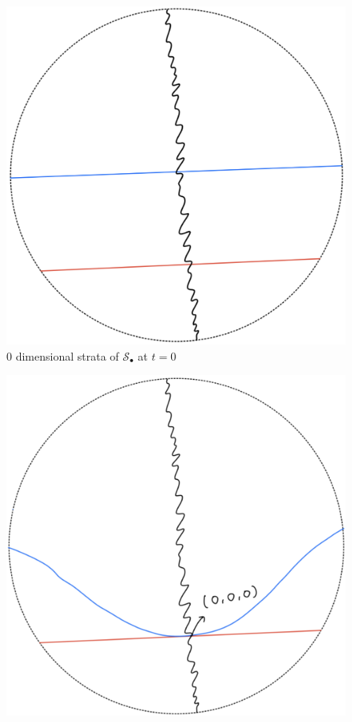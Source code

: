 \begin{definition}
\begin{enumerate}
\begin{itemize}
\begin{figure}[H]
    \centering
    \includegraphics[scale = 0.95]{diagrams/lemma1/16.png} 
    \caption{0 dimensional strata of $\mathcal{S}_\bullet$ at $t=0$}
    \label{fig:your-label}
\end{figure}
\begin{figure}[H]
    \centering
    \includegraphics[scale = 0.95]{diagrams/lemma1/17.png} 

\end{figure}
\end{itemize}
\end{enumerate}
\end{definition}
